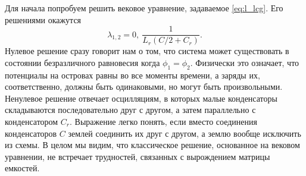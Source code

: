 \documentclass[14pt, a4paper]{extreport}
\numberwithin{equation}{section}
\begin{document}
Для начала попробуем решить вековое уравнение, задаваемое \eqref{eq:l_lcg}. Его решениями окажутся
\begin{equation}
	\lambda_{1,2} = 0,\ \frac {1}{L_r \left( C/2 + C_r \right) }.	
\end{equation}
Нулевое решение сразу говорит нам о том, что система может существовать в состоянии безразличного равновесия когда $\phi_1 = \phi_2$. Физически это означает, что потенциалы на островах равны во все моменты времени, а заряды их, соответственно, должны быть одинаковыми, но могут быть произвольными. Ненулевое решение отвечает осцилляциям, в которых малые конденсаторы складываются последовательно друг с другом, а затем параллельно с конденсатором $C_r$. Выражение легко понять, если вместо соединения конденсаторов $C$ землей соединить их друг с другом, а землю вообще исключить из схемы. В целом мы видим, что классическое решение, основанное на вековом уравнении, не встречает трудностей, связанных с вырождением матрицы емкостей.
\end{document}
